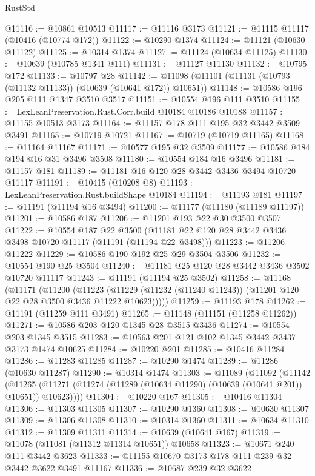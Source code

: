 \begin{lexlean}{RustStd}
\begin{coremodule}
@11116 := @10861 @10513
@11117 := @11116 @3173
@11121 := @11115 @11117 (@10416 (@10774 @172))
@11122 := @10290 @1374
@11124 := @11121 (@10630 @11122)
@11125 := @10314 @1374
@11127 := @11124 (@10634 @11125)
@11130 := @10639 (@10785 @1341 @111)
@11131 := @11127 @11130
@11132 := @10795 @172
@11133 := @10797 @28
@11142 := @11098 (@11101 (@11131 (@10793 (@11132 @11133)) (@10639 (@10641 @172)) @10651))
@11148 := @10586 @196 @205 @111 @1347 @3510 @3517
@11151 := @10554 @196 @111 @3510
@11155 := LexLeanPreservation.Rust.Corr.build @10184 @10186 @10188
@11157 := @11155 @10513 @3173
@11164 := @11157 @178 @111 @195 @32 @3442 @3509 @3491
@11165 := @10719 @10721
@11167 := @10719 (@10719 @11165)
@11168 := @11164 @11167
@11171 := @10577 @195 @32 @3509
@11177 := @10586 @184 @194 @16 @31 @3496 @3508
@11180 := @10554 @184 @16 @3496
@11181 := @11157 @181
@11189 := @11181 @16 @120 @28 @3442 @3436 @3494 @10720 @11117
@11191 := @10415 (@10208 @8)
@11193 := LexLeanPreservation.Rust.buildShape @10184
@11194 := @11193 @181
@11197 := @11191 (@11194 @16 @3494)
@11200 := @11177 (@11180 (@11189 @11197))
@11201 := @10586 @187
@11206 := @11201 @193 @22 @30 @3500 @3507
@11222 := @10554
    @187
    @22
    @3500
    (@11181 @22 @120 @28 @3442 @3436 @3498 @10720 @11117 (@11191 (@11194 @22 @3498)))
@11223 := @11206 @11222
@11229 := @10586 @190 @192 @25 @29 @3504 @3506
@11232 := @10554 @190 @25 @3504
@11240 := @11181 @25 @120 @28 @3442 @3436 @3502 @10720 @11117
@11243 := @11191 (@11194 @25 @3502)
@11258 := @11168
    (@11171
      (@11200
        (@11223 (@11229 (@11232 (@11240 @11243)) (@11201 @120 @22 @28 @3500 @3436 @11222 @10623)))))
@11259 := @11193 @178
@11262 := @11191 (@11259 @111 @3491)
@11265 := @11148 (@11151 (@11258 @11262))
@11271 := @10586 @203 @120 @1345 @28 @3515 @3436
@11274 := @10554 @203 @1345 @3515
@11283 := @10563 @201 @121 @102 @1345 @3442 @3437 @3173 @1474 @10625
@11284 := @10220 @201
@11285 := @10416 @11284
@11286 := @11283 @11285
@11287 := @10290 @1474
@11289 := @11286 (@10630 @11287)
@11290 := @10314 @1474
@11303 := @11089
    (@11092
      (@11142
        (@11265 (@11271 (@11274 (@11289 (@10634 @11290) (@10639 (@10641 @201)) @10651)) @10623))))
@11304 := @10220 @167
@11305 := @10416 @11304
@11306 := @11303 @11305
@11307 := @10290 @1360
@11308 := @10630 @11307
@11309 := @11306 @11308
@11310 := @10314 @1360
@11311 := @10634 @11310
@11312 := @11309 @11311
@11314 := @10639 (@10641 @167)
@11319 := @11078 (@11081 (@11312 @11314 @10651)) @10658
@11323 := @10671 @240 @111 @3442 @3623
@11333 := @11155 @10670 @3173 @178 @111 @239 @32 @3442 @3622 @3491 @11167
@11336 := @10687 @239 @32 @3622

\end{coremodule}
\end{lexlean}
